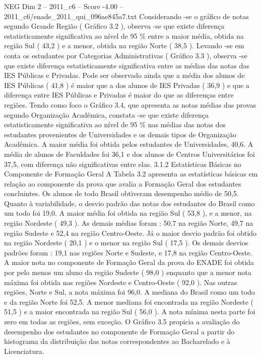 \begin{textsample}{NEG Dim 2 – 2011\_c6 – Score -4.00 – 2011\_c6/enade\_2011\_qui\_096ae845a7.txt}
Considerando -se o gráfico de notas segundo Grande Região ( Gráfico 3.2 ), observa -se que existe diferença estatisticamente significativa ao nível de 95 \% entre a maior média, obtida na região Sul ( 43,2 ) e a menor, obtida na região Norte ( 38,5 ).
Levando -se em conta os estudantes por Categorias Administrativas ( Gráfico 3.3 ), observa -se que existe diferença estatisticamente significativa entre as médias das notas das IES Públicas e Privadas.
Pode ser observado ainda que a média dos alunos de IES Públicas ( 41,8 ) é maior que a dos alunos de IES Privadas ( 36,9 ) e que a diferença entre IES Públicas e Privadas é maior do que as diferenças entre regiões.
Tendo como foco o Gráfico 3.4, que apresenta as notas médias das provas segundo Organização Acadêmica, constata -se que existe diferença estatisticamente significativa ao nível de 95 \% nas médias das notas dos estudantes provenientes de Universidades e os demais tipos de Organização Acadêmica.
A maior média foi obtida pelos estudantes de Universidades, 40,6.
A média de alunos de Faculdades foi 36,1 e dos alunos de Centros Universitários foi 37,5, com diferença não significativas entre elas. 3.1.2 Estatísticas Básicas no Componente de Formação Geral A Tabela 3.2 apresenta as estatísticas básicas em relação ao componente da prova que avalia a Formação Geral dos estudantes concluintes.
Os alunos de todo Brasil obtiveram desempenho médio de 50,5.
Quanto à variabilidade, o desvio padrão das notas dos estudantes do Brasil como um todo foi 19,0.
A maior média foi obtida na região Sul ( 53,8 ), e a menor, na região Nordeste ( 49,3 ).
As demais médias foram : 50,7 na região Norte, 49,7 na região Sudeste e 52,4 na região Centro-Oeste.
Já o maior desvio padrão foi obtido na região Nordeste ( 20,1 ) e o menor na região Sul ( 17,5 ).
Os demais desvios padrões foram : 19,1 nas regiões Norte e Sudeste, e 17,8 na região Centro-Oeste.
A maior nota no componente de Formação Geral da prova do ENADE foi obtida por pelo menos um aluno da região Sudeste ( 98,0 ) enquanto que a menor nota máxima foi obtida nas regiões Nordeste e Centro-Oeste ( 92,0 ).
Nas outras regiões, Norte e Sul, a nota máxima foi 96,0.
A mediana do Brasil como um todo e da região Norte foi 52,5.
A menor mediana foi encontrada na região Nordeste ( 51,5 ) e a maior encontrada na região Sul ( 56,0 ).
A nota mínima nesta parte foi zero em todas as regiões, sem exceção.
O Gráfico 3.5 propicia a avaliação do desempenho dos estudantes no componente de Formação Geral a partir do histograma da distribuição das notas correspondentes ao Bacharelado e à Licenciatura.

\end{textsample}
